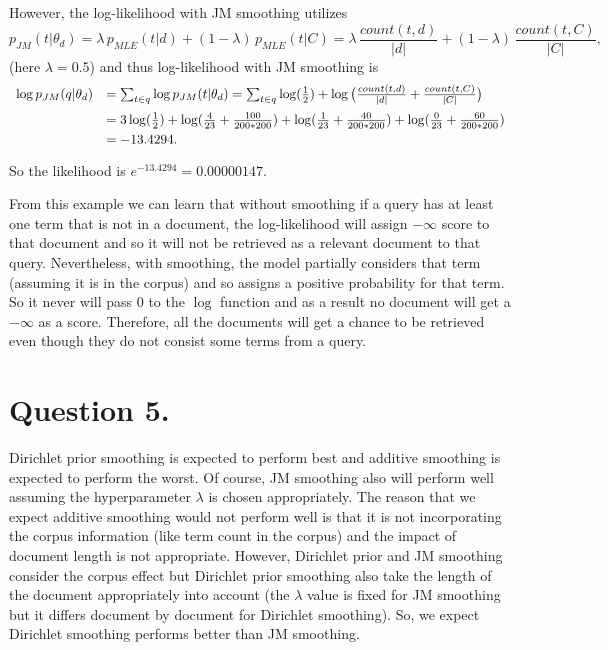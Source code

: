 \documentclass[11pt]{article}
\begin{document}
However, the log-likelihood with JM smoothing utilizes 
$$p_{JM}(t| \theta_d) = \lambda \, p_{MLE}(t| d) + (1- \lambda) \, p_{MLE}(t | C) = \lambda \, \frac{count(t, d)}{|d|} + (1 - \lambda) \, \frac{count(t, C)}{|C|},$$ 
(here $\lambda = 0.5$) and thus log-likelihood with JM smoothing is 
$$\begin{array}{ll} \vspace{2mm}
\log p_{JM}(q| \theta_d) & = \sum_{t \in q} \log p_{JM}(t| \theta_d) = \sum_{t \in q}   \log(\frac{1}{2}) + \log\big(\frac{count(t, d)}{|d|} + \frac{count(t, C)}{|C|}\big) \\ \vspace{1mm} &
=3 \log(\frac{1}{2}) + \log(\frac{4}{23} + \frac{100}{200*200}) + \log(\frac{1}{23} + \frac{40}{200*200}) + \log(\frac{0}{23} + \frac{60}{200*200}) \\ \vspace{1mm} & 
= -13.4294.
\end{array}$$
So the likelihood is $e^{-13.4294}= 0.00000147$.

From this example we can learn that without smoothing if a query has at least one term that is not in a document, the log-likelihood will assign $-\infty$ score to that document and so it will not be retrieved as a relevant document to that query. Nevertheless, with smoothing, the model partially considers that term (assuming it is in the corpus) and so assigns a positive probability for that term. So it never will pass 0 to the $\log$ function and as a result no document will get a $-\infty$ as a score. Therefore, all the documents will get a chance to be retrieved even though they do not consist some terms from a query. 



\section*{Question 5.}%
Dirichlet prior smoothing is expected to perform best and additive smoothing is expected to perform the worst. Of course, JM smoothing also will perform well assuming the hyperparameter $\lambda$ is chosen appropriately. The reason that we expect additive smoothing would not perform well is that it is not incorporating the corpus information (like term count in the corpus) and the impact of document length is not appropriate. However, Dirichlet prior and JM smoothing consider the corpus effect but Dirichlet prior smoothing also take the length of the document appropriately into account (the $\lambda$ value is fixed for JM smoothing but it differs document by document for Dirichlet smoothing). So, we expect Dirichlet smoothing performs better than JM smoothing. 
\end{document}
